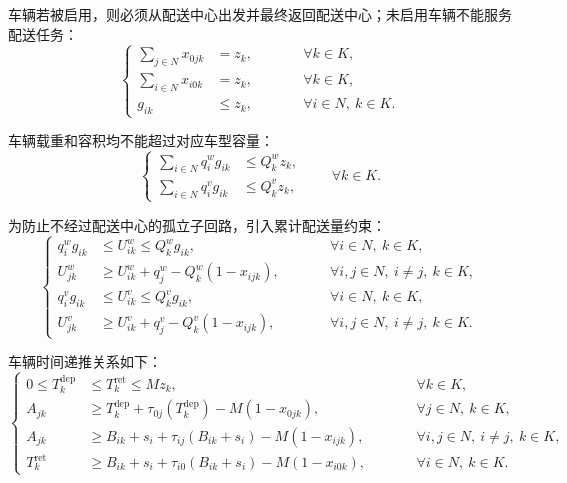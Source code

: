 \documentclass[withoutpreface,bwprint]{cumcmthesis} %
\begin{document}
车辆若被启用，则必须从配送中心出发并最终返回配送中心；未启用车辆不能服务配送任务：
\begin{equation}
\left\{
\begin{alignedat}{2}
\sum_{j\in N}x_{0jk} &=z_k,
&\qquad& \forall k\in K,\\
\sum_{i\in N}x_{i0k} &=z_k,
&& \forall k\in K,\\
g_{ik} &\leq z_k,
&& \forall i\in N,\ k\in K.
\end{alignedat}
\right.
\label{eq:depot_activation}
\end{equation}

车辆载重和容积均不能超过对应车型容量：
\begin{equation}
\left\{
\begin{aligned}
\sum_{i\in N}q_i^w g_{ik} &\leq Q_k^w z_k,\\
\sum_{i\in N}q_i^v g_{ik} &\leq Q_k^v z_k,
\end{aligned}
\right.
\qquad \forall k\in K.
\label{eq:capacity}
\end{equation}

为防止不经过配送中心的孤立子回路，引入累计配送量约束：
\begin{equation}
\left\{
\begin{alignedat}{2}
q_i^w g_{ik} &\leq U_{ik}^w \leq Q_k^w g_{ik},
&\qquad& \forall i\in N,\ k\in K,\\
U_{jk}^w &\geq U_{ik}^w+q_j^w-Q_k^w(1-x_{ijk}),
&& \forall i,j\in N,\ i\ne j,\ k\in K,\\
q_i^v g_{ik} &\leq U_{ik}^v \leq Q_k^v g_{ik},
&& \forall i\in N,\ k\in K,\\
U_{jk}^v &\geq U_{ik}^v+q_j^v-Q_k^v(1-x_{ijk}),
&& \forall i,j\in N,\ i\ne j,\ k\in K.
\end{alignedat}
\right.
\label{eq:subtour_capacity}
\end{equation}

车辆时间递推关系如下：
\begin{equation}
\left\{
\begin{alignedat}{2}
0\leq T_k^{\mathrm{dep}}
&\leq T_k^{\mathrm{ret}}\leq Mz_k,
&\qquad& \forall k\in K,\\
A_{jk}
&\geq T_k^{\mathrm{dep}}+\tau_{0j}(T_k^{\mathrm{dep}})
-M(1-x_{0jk}),
&& \forall j\in N,\ k\in K,\\
A_{jk}
&\geq B_{ik}+s_i+\tau_{ij}(B_{ik}+s_i)
-M(1-x_{ijk}),
&& \forall i,j\in N,\ i\ne j,\ k\in K,\\
T_k^{\mathrm{ret}}
&\geq B_{ik}+s_i+\tau_{i0}(B_{ik}+s_i)
-M(1-x_{i0k}),
&& \forall i\in N,\ k\in K.
\end{alignedat}
\right.
\label{eq:time_recursion}
\end{equation}
\end{document}
